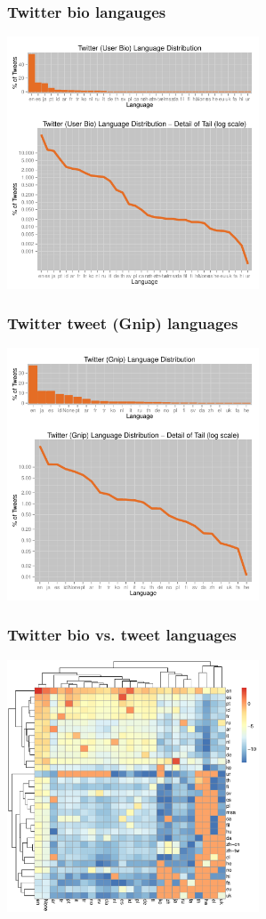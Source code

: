 \documentclass{beamer}
\begin{document}
\begin{frame}\frametitle{Twitter bio langauges}
  \begin{center}
    \includegraphics[width=7.5cm]{./imgs/distro_bio.pdf}
  \end{center}
\end{frame}


\begin{frame}\frametitle{Twitter tweet (Gnip) languages}
  \begin{center}
    \includegraphics[width=7.5cm]{./imgs/distro_gnip.pdf}
  \end{center}
\end{frame}


\begin{frame}\frametitle{Twitter bio vs. tweet languages}
  \begin{center}
    \includegraphics[width=7.5cm]{./imgs/heatmap.pdf}
  \end{center}
\end{frame}
\end{document}
